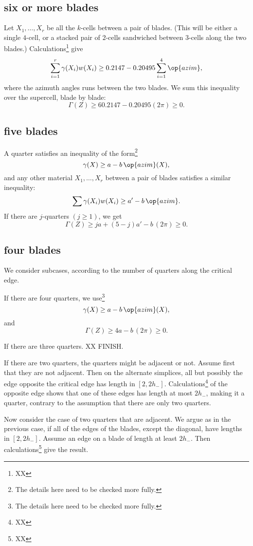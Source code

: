 \subsection{six or more blades}

Let $X_1,\ldots,X_r$ be all the $k$-cells between a pair of
blades.  (This will be either a single $4$-cell, or a stacked pair of $2$-cells sandwiched between $3$-cells along
the two blades.)  Calculations\footnote{XX} give
$$\sum_{i=1}^r \gamma(X_i) w(X_i) \ge 0.2147 - 0.20495\sum_{i=1}^4 \op{azim},$$
where the azimuth angles runs between the two blades.
We sum this inequality over the supercell, blade by blade:
$$
\Gamma(Z) \ge 6 0.2147 - 0.20495 (2\pi) \ge 0.
$$


\subsection{five blades}


A quarter satisfies an inequality of the form\footnote{The details here need to be checked more fully.}
$$
\gamma(X) \ge a - b\, \op{azim}(X),
$$
and any other material $X_1,\ldots,X_r$
between a pair of blades
satisfies a similar inequality:
$$
\sum \gamma(X_i)w(X_i) \ge a' - b\,\op{azim}.
$$
If there are $j$-quarters $(j\ge1)$, we get
$$
\Gamma(Z) \ge j a + (5-j) a' - b\, (2\pi) \ge 0.
$$

\subsection{four blades}

We consider subcases, according to the number of quarters along the critical edge.

If there are four quarters, we use\footnote{The details here need to be checked more fully.}
$$
\gamma(X) \ge a - b\, \op{azim}(X),
$$
and
$$
\Gamma(Z) \ge 4 a  - b\, (2\pi) \ge 0.
$$

If there are three quarters. XX FINISH.

If there are two quarters, the quarters might be adjacent or not.  Assume first that they are not adjacent.  Then
on the alternate simplices, all but possibly the edge
opposite the critical edge has length in $[2,2h_-]$.
Calculations\footnote{XX} of the opposite edge shows that
one of these edges has length at most $2h_-$, making it a quarter, contrary to the assumption that there are only two quarters.

Now consider the case of two quarters that are adjacent.  We argue as in the previous case, if all of the edges of the blades, except the diagonal, have lengths in $[2,2h_-]$.  Assume an edge on a blade of length at least $2h_-$.  Then calculations\footnote{XX} give the result.

